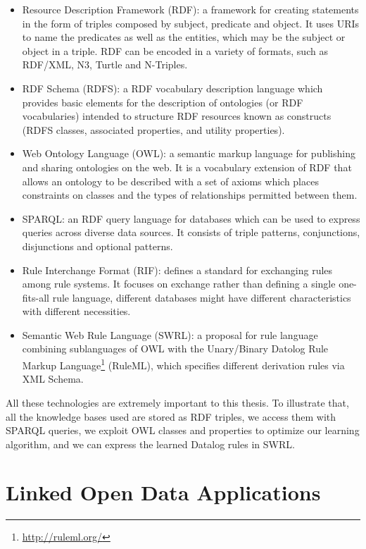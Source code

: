 \begin{itemize}
 \item Resource Description Framework (RDF): a framework for creating statements in the form of triples composed by
subject, predicate and object. It uses URIs to name the predicates as well as the entities, which may be the subject
or
object in a triple. RDF can be encoded in a variety of formats, such as RDF/XML, N3, Turtle and N-Triples.
 \item RDF Schema (RDFS): a RDF vocabulary description language which provides basic elements for the description of
ontologies (or RDF vocabularies) intended to structure RDF resources known as constructs (RDFS classes, associated
properties, and utility properties).
 \item Web Ontology Language (OWL): a semantic markup language for publishing and sharing ontologies on the web. It is
a
vocabulary extension of RDF that allows an ontology to be described with a set of axioms which places constraints on
classes and the types of relationships permitted between them.
 \item SPARQL: an RDF query language for databases which can be used to express queries across diverse data sources.
It
consists of triple patterns, conjunctions, disjunctions and optional patterns. 
 \item Rule Interchange Format (RIF): defines a standard for exchanging rules among rule systems. It focuses on
exchange rather than defining a single one-fits-all rule language, different databases might have different
characteristics with different necessities.
  \item Semantic Web Rule Language (SWRL): a proposal for rule language combining sublanguages of OWL with the
Unary/Binary Datolog Rule Markup Language\footnote{\url{http://ruleml.org/}} (RuleML), which specifies different
derivation rules via XML Schema.
\end{itemize}

All these technologies are extremely important to this thesis. To illustrate that, all the knowledge bases used are
stored as RDF triples, we access them with SPARQL queries, we exploit OWL classes and properties to optimize our
learning algorithm, and we can express the learned Datalog rules in SWRL.



\section{Linked Open Data Applications}
\label{sec:rw-lod}


